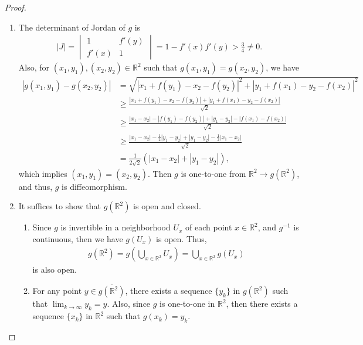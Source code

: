 \documentclass[11pt]{article}
\theoremstyle{definition}
\numberwithin{equation}{subsection}
\begin{document}
\begin{proof}
~\begin{enumerate}[label=(\alph*)]
    \item The determinant of Jordan of $g$ is
    \begin{align*}
        |J| = \begin{vmatrix}
            1 & f'(y) \\
            f'(x) & 1
        \end{vmatrix} = 1 - f'(x)f'(y) > \frac{3}{4} \neq 0.
    \end{align*}
    Also, for $(x_1, y_1), (x_2, y_2) \in \mathbb{R}^2$ such that $g(x_1, y_1) = g(x_2, y_2)$, we have
    \begin{align*}
        |g(x_1, y_1) - g(x_2, y_2)| & = \sqrt{|x_1 + f(y_1) - x_2 - f(y_2)|^2 + |y_1 + f(x_1) - y_2 - f(x_2)|^2} \\
        & \geq \frac{|x_1 + f(y_1) - x_2 - f(y_2)| + |y_1 + f(x_1) - y_2 - f(x_2)|}{\sqrt{2}} \\
        & \geq \frac{|x_1 - x_2| - |f(y_1) - f(y_2)| + |y_1 - y_2| - |f(x_1) - f(x_2)|}{\sqrt{2}} \\
        & \geq \frac{|x_1 - x_2| - \frac{1}{2}|y_1 - y_2| + |y_1 - y_2| - \frac{1}{2}|x_1 - x_2|}{\sqrt{2}} \\
        & = \frac{1}{2\sqrt{2}} \left(|x_1 - x_2| + |y_1 - y_2| \right),
    \end{align*}
    which implies $(x_1, y_1) = (x_2, y_2)$. Then $g$ is one-to-one from $\mathbb{R}^2 \to g(\mathbb{R}^2)$, and thus, $g$ is diffeomorphism.
    
    \item It suffices to show that $g(\mathbb{R}^2)$ is open and closed.
    \begin{enumerate}[label=\arabic*)]
        \item Since $g$ is invertible in a neighborhood $U_x$ of each point $x \in \mathbb{R}^2$, and $g^{-1}$ is continuous, then we have $g(U_x)$ is open. Thus,
        \begin{align*}
            g(\mathbb{R}^2) = g \left( \bigcup_{x \in \mathbb{R}^2} U_x \right) = \bigcup_{x \in \mathbb{R}^2} g(U_x)
        \end{align*}
        is also open.
        
        \item For any point $y \in \overline{g(\mathbb{R}^2)}$, there exists a sequence $\{y_k\}$ in $g(\mathbb{R}^2)$ such that $\lim_{k\to\infty} y_k = y$. Also, since $g$ is one-to-one in $\mathbb{R}^2$, then there exists a sequence $\{x_k\}$ in $\mathbb{R}^2$ such that $g(x_k) = y_k$.
        

\end{enumerate}
\end{enumerate}
\end{proof}
\end{document}
